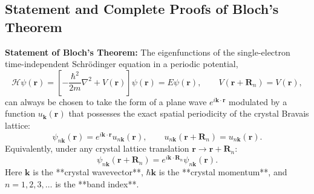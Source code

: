 \documentclass[11pt,a4paper]{article}
\newcommand{\hb}{\hbar}
\newcommand{\hbarsq}{\hb^2}
\newcommand{\kk}{\mathbf{k}}
\newcommand{\RR}{\mathbf{R}}
\newcommand{\rvec}{\mathbf{r}}
\begin{document}
\subsection{Statement and Complete Proofs of Bloch's Theorem}
\textbf{Statement of Bloch's Theorem:} The eigenfunctions of the single-electron time-independent Schr\"odinger equation in a periodic potential,
\begin{equation}
    \mathcal{H}\psi(\rvec) = \left[-\frac{\hbarsq}{2m}\nabla^2 + V(\rvec)\right]\psi(\rvec) = E\psi(\rvec), \qquad V(\rvec + \RR_n) = V(\rvec),
    \label{eq:schrodinger_bloch}
\end{equation}
can always be chosen to take the form of a plane wave $e^{i\kk\cdot\rvec}$ modulated by a function $u_{\kk}(\rvec)$ that possesses the exact spatial periodicity of the crystal Bravais lattice:
\begin{equation}
    \boxed{\psi_{n\kk}(\rvec) = e^{i\kk\cdot\rvec}u_{n\kk}(\rvec), \qquad u_{n\kk}(\rvec + \RR_n) = u_{n\kk}(\rvec).}
    \label{eq:bloch_form1}
\end{equation}
Equivalently, under any crystal lattice translation $\rvec \to \rvec + \RR_n$:
\begin{equation}
    \boxed{\psi_{n\kk}(\rvec + \RR_n) = e^{i\kk\cdot\RR_n}\psi_{n\kk}(\rvec).}
    \label{eq:bloch_form2}
\end{equation}
Here $\kk$ is the **crystal wavevector**, $\hb\kk$ is the **crystal momentum**, and $n = 1, 2, 3, \dots$ is the **band index**.
\end{document}

